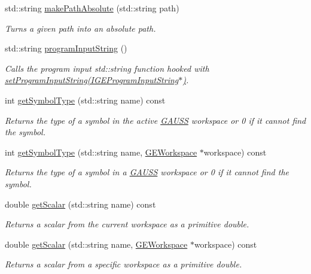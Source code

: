 \begin{DoxyCompactItemize}
std\+::string \hyperlink{class_g_a_u_s_s_a428f307c0d147730f80b0c3779ddbd32}{make\+Path\+Absolute} (std\+::string path)
\begin{DoxyCompactList}\small\item\em Turns a given path into an absolute path. \end{DoxyCompactList}\item 
std\+::string \hyperlink{class_g_a_u_s_s_afdcb5a64e926589539138da46dc92020}{program\+Input\+String} ()
\begin{DoxyCompactList}\small\item\em Calls the program input std\+::string function hooked with \hyperlink{class_g_a_u_s_s_ae82b5bfdf26971433c46936a812506c3}{set\+Program\+Input\+String(\+I\+G\+E\+Program\+Input\+String$\ast$)}. \end{DoxyCompactList}\item 
int \hyperlink{class_g_a_u_s_s_affddec69fb9e28734a9a8f8716b38b9f}{get\+Symbol\+Type} (std\+::string name) const
\begin{DoxyCompactList}\small\item\em Returns the type of a symbol in the active \hyperlink{class_g_a_u_s_s}{G\+A\+U\+SS} workspace or 0 if it cannot find the symbol. \end{DoxyCompactList}\item 
int \hyperlink{class_g_a_u_s_s_ad395f10e4e160edbdc8f238dc737d9fc}{get\+Symbol\+Type} (std\+::string name, \hyperlink{class_g_e_workspace}{G\+E\+Workspace} $\ast$workspace) const
\begin{DoxyCompactList}\small\item\em Returns the type of a symbol in a \hyperlink{class_g_a_u_s_s}{G\+A\+U\+SS} workspace or 0 if it cannot find the symbol. \end{DoxyCompactList}\item 
double \hyperlink{class_g_a_u_s_s_ae15a1bc10f089f608f34f56f6cefecf1}{get\+Scalar} (std\+::string name) const
\begin{DoxyCompactList}\small\item\em Returns a scalar from the current workspace as a primitive {\ttfamily double}. \end{DoxyCompactList}\item 
double \hyperlink{class_g_a_u_s_s_a03682b1a4ca0fc709cab98c42b8f0e33}{get\+Scalar} (std\+::string name, \hyperlink{class_g_e_workspace}{G\+E\+Workspace} $\ast$workspace) const
\begin{DoxyCompactList}\small\item\em Returns a scalar from a specific workspace as a primitive {\ttfamily double}. \end{DoxyCompactList}\item 

\end{DoxyCompactItemize}
